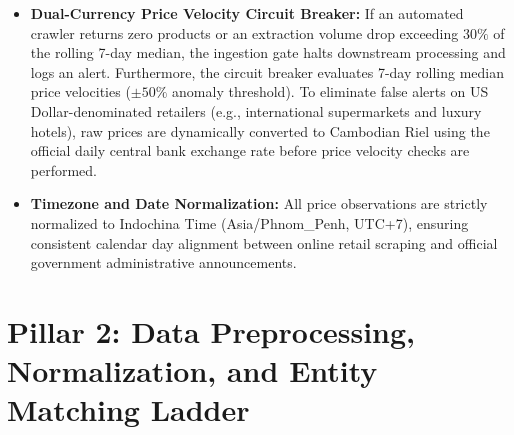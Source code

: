 \begin{itemize}
    \item \textbf{Dual-Currency Price Velocity Circuit Breaker:} If an automated crawler returns zero products or an extraction volume drop exceeding $30\%$ of the rolling 7-day median, the ingestion gate halts downstream processing and logs an alert. Furthermore, the circuit breaker evaluates 7-day rolling median price velocities ($\pm 50\%$ anomaly threshold). To eliminate false alerts on US Dollar-denominated retailers (e.g., international supermarkets and luxury hotels), raw prices are dynamically converted to Cambodian Riel using the official daily central bank exchange rate before price velocity checks are performed.
    \item \textbf{Timezone and Date Normalization:} All price observations are strictly normalized to Indochina Time (Asia/Phnom\_Penh, UTC+7), ensuring consistent calendar day alignment between online retail scraping and official government administrative announcements.
\end{itemize}

\section{Pillar 2: Data Preprocessing, Normalization, and Entity Matching Ladder}

